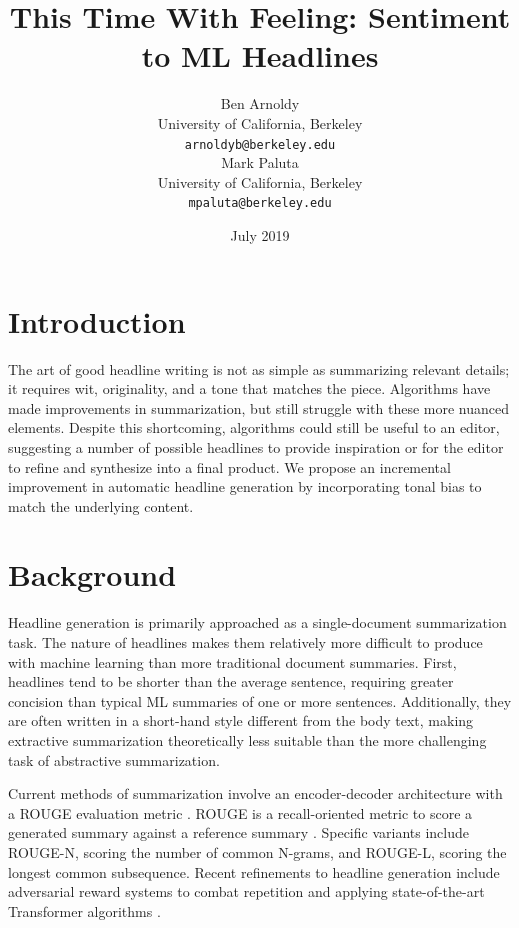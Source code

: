 \documentclass[11pt]{article}
\title{This Time With Feeling: Sentiment to ML Headlines}
\author{Ben Arnoldy \\
  University of California, Berkeley \\
  {\tt arnoldyb@berkeley.edu} \\\And
  Mark Paluta \\
  University of California, Berkeley \\
  {\tt mpaluta@berkeley.edu} \\}
\date{July 2019}
\begin{document}
\maketitle

\begin{abstract}
    
\end{abstract}

\section{Introduction}
The art of good headline writing is not as simple as summarizing relevant details; it requires wit, originality, and a tone that matches the piece. Algorithms have made improvements in summarization, but still struggle with these more nuanced elements. Despite this shortcoming, algorithms could still be useful to an editor, suggesting a number of possible headlines to provide inspiration or for the editor to refine and synthesize into a final product. We propose an incremental improvement in automatic headline generation by incorporating tonal bias to match the underlying content.

\section{Background}
Headline generation is primarily approached as a single-document summarization task. The nature of headlines makes them relatively more difficult to produce with machine learning than more traditional document summaries. First, headlines tend to be shorter than the average sentence, requiring greater concision than typical ML summaries of one or more sentences. Additionally, they are often written in a short-hand style different from the body text, making extractive summarization theoretically less suitable than the more challenging task of abstractive summarization. 

Current methods of summarization involve an encoder-decoder architecture \citep{rush2015neural} with a ROUGE evaluation metric \cite{Ayana2017}. ROUGE is a recall-oriented metric to score a generated summary against a reference summary \cite{lin-2004-rouge}. Specific variants include ROUGE-N, scoring the number of common N-grams, and ROUGE-L, scoring the longest common subsequence. Recent refinements to headline generation include adversarial reward systems to combat repetition \cite{DBLP:journals/corr/abs-1902-07110} and applying state-of-the-art Transformer algorithms \cite{DBLP:journals/corr/abs-1901-07786}.
\end{document}
